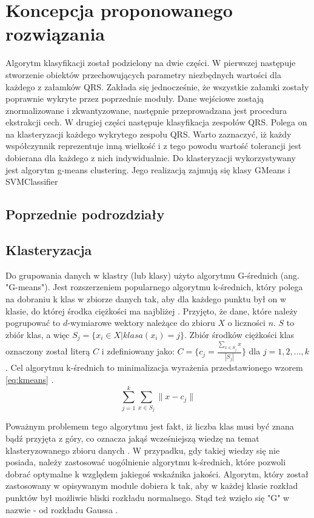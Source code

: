 \section{Koncepcja proponowanego rozwiązania}

\qquad Algorytm klasyfikacji został podzielony na dwie części. W pierwszej następuje stworzenie obiektów przechowujących parametry niezbędnych wartości dla każdego z załamków QRS. Zakłada się jednocześnie, że wszystkie załamki zostały poprawnie wykryte przez poprzednie moduły. Dane wejściowe zostają znormalizowane i zkwantyzowane, następnie przeprowadzana jest procedura ekstrakcji cech. W drugiej części następuje klasyfikacja zespołów QRS. Polega on na  klasteryzacji każdego wykrytego zespołu QRS. Warto zaznaczyć, iż każdy współczynnik reprezentuje inną wielkość i z tego powodu wartość tolerancji jest dobierana dla każdego z nich indywidualnie. Do klasteryzacji wykorzystywany jest algorytm g-means clustering. Jego realizacją zajmują się klasy GMeans i SVMClassifier

\subsection{Poprzednie podrozdziały}

\subsection{Klasteryzacja}

\qquad Do grupowania danych w klastry (lub klasy) użyto algorytmu G-średnich (ang. "G-means"). Jest rozszerzeniem popularnego algorytmu k-średnich, który polega na dobraniu k klas w zbiorze danych tak, aby dla każdego punktu był on w klasie, do której środka ciężkości ma najbliżej \cite{KMeans}. Przyjęto, że dane, które należy pogrupować to $d$-wymiarowe wektory należące do zbioru $X$ o liczności $n$. $S$ to zbiór klas, a więc $S_{j} = \{x_{i} \in X | klasa(x_{i}) = j\}$. Zbiór środków ciężkości klas oznaczony został literą $C$ i zdefiniowany jako: $C = \{c_{j} = \frac{\sum_{x \in S_{j}} x}{|S_{j}|}\}$ dla $j = 1, 2, ..., k$.
Cel algorytmu k-średnich to minimalizacja wyrażenia przedstawionego wzorem \ref{eq:kmeans} .
\begin{equation}
\label{eq:kmeans}
\sum_{j=1}^{k}\sum_{x \in S_{j}} \|x - c_{j}\|
\end{equation}

Poważnym problemem tego algorytmu jest fakt, iż liczba klas musi być znana bądź przyjęta z góry, co oznacza jakąś wcześniejszą wiedzę na temat klasteryzowanego zbioru danych \cite{GMeans}. W przypadku, gdy takiej wiedzy się nie posiada, należy zastosować uogólnienie algorytmu k-średnich, które pozwoli dobrać optymalne k względem jakiegoś wskaźnika jakości.
Algorytm, który został zastosowany w opisywanym module dobiera k tak, aby w każdej klasie rozkład punktów był możliwie bliski rozkładu normalnego. Stąd też wzięło się "G" w nazwie - od rozkładu Gaussa \cite{GMeans}.

